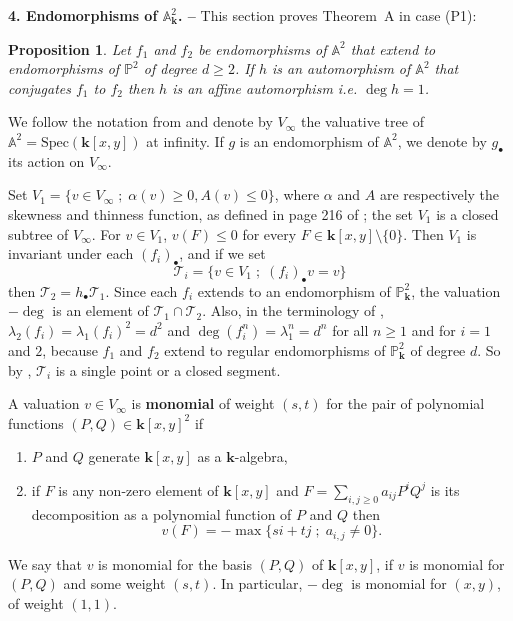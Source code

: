 \documentclass[reqno,oneside,12pt]{amsart}
\theoremstyle{plain}
\newtheorem{pro}[thm]{Proposition}
\theoremstyle{definition}
\def\bfk{{\mathbf{k}}}
\newcommand{\bbA}{{\mathbb{A}}}
\newcommand{\Spec}{{\mathrm{Spec}}}
\newcommand{\sT}{{\mathcal T}}
\def\P{\mathbb{P}}
\begin{document}
{{{{\medskip


{\noindent}{\bf{4. Endomorphisms of $\bbA^2_\bfk$. --}}
This section proves Theorem~A in case (P1):  

\begin{pro}\label{propolyendo} Let $f_1$ and $f_2$ be endomorphisms  of $\bbA^2$ that extend to endomorphisms of $\P^2$ of degree $d\geq 2$. If $h$ is an automorphism of $\bbA^2$ that conjugates $f_1$ to $f_2$ then  $h$ is an affine automorphism i.e. $\deg h=1$.
\end{pro}

We follow the notation from \cite{Favre2011} and denote by 
$V_{\infty}$ the valuative tree of $\bbA^2=\Spec ( \bfk[x,y] )$ at infinity.
If $g$ is an endomorphism of $\bbA^2$, we denote by $g_\bullet$ its action on $V_{\infty}$.
 
Set $V_1=\{v\in V_{\infty} \; ; \; \alpha(v)\geq 0, A(v)\leq 0\}$, where $\alpha$ 
and $A$ are respectively the skewness and thinness function, as defined in page 216 of
\cite{Favre2011}; the set $V_1$  is a closed subtree of $V_{\infty}$. For $v\in V_1$, $v(F)\leq  0$ for every $F\in \bfk[x,y]\setminus \{0\}$. 
Then $V_1$ is invariant under each $({f_i})_{\bullet}$, and if we 
set 
\begin{equation}
\sT_i=\{v \in V_1 \; ; \; ({f_i})_{\bullet}v=v\}
\end{equation} 
then $\sT_2=h_{\bullet}\sT_1$. Since each $f_i$ extends to an endomorphism of $\P^2_\bfk$, the valuation  $-\deg$ is an element of $\sT_1\cap \sT_2$. Also, in the terminology of \cite{Favre2011}, $\lambda_2(f_i)=\lambda_1(f_i)^2=d^2$ and $\deg(f_i^n)=\lambda_1^n=d^n$ 
for all $n\geq 1$ and for $i=1$ and $2$, because $f_1$ and $f_2$ extend to regular endomorphisms of $\P^2_\bfk$ of degree $d$. So
by \cite[Proposition 5.3 (a)]{Favre2011}, $\sT_i$ is a single point or a closed segment.  

\smallskip 

A valuation $v\in V_{\infty}$ is {\bf{monomial}}  of weight $(s,t)$ for the pair of polynomial functions $(P,Q)\in \bfk[x,y]^2$ if 
\begin{enumerate}
\item $P$ and $Q$ generate $\bfk[x,y]$ as a $\bfk$-algebra,
\item if $F$ is any non-zero element of $\bfk[x,y]$ and $F=\sum_{i,j\geq 0}a_{ij}P^iQ^j$ is its decomposition as a polynomial function
of  $P$ and $Q$ then
\begin{equation}
v(F)=-\max\{si+tj \; ; \; a_{i,j}\neq 0\}.
\end{equation}
\end{enumerate}
We say that $v$ is monomial for the basis  $(P,Q)$ of $\bfk[x,y]$, if  $v$ is monomial for $(P,Q)$ and some weight $(s,t)$.
In particular, $-\deg$ is monomial for $(x,y)$, of weight $(1,1).$

}}}}
\end{document}
